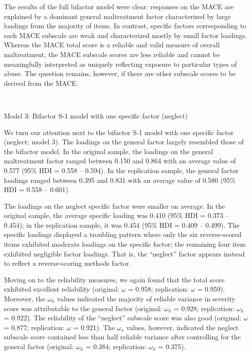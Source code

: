 \documentclass[letterpaper,man,natbib,noextraspace,floatsintext,longtable]{apa6}
\makeatletter
\renewcommand{\subsubsection}{\@startsection{subsubsection}{3}
  {\z@}%
  {\b@level@two@skip}{\e@level@two@skip}%
  {\normalfont\normalsize\bfseries}}
\makeatother
\begin{document}
The results of the full bifactor model were clear: responses on the MACE are explained by a dominant general maltreatment factor characterized by large loadings from the majority of items. In contrast, specific factors corresponding to each MACE subscale are weak and characterized mostly by small factor loadings. Whereas the MACE total score is a reliable and valid measure of overall maltreatment, the MACE subscale scores are less reliable and cannot be meaningfully interpreted as uniquely reflecting exposure to particular types of abuse. The question remains, however, if there are other subscale scores to be derived from the MACE. 

{\begin{spacing}{0.2} \hfill \\ \end{spacing}} \subsubsection{Model 3: Bifactor S-1 model with one specific factor (neglect)}

We turn our attention next to the bifactor S-1 model with one specific factor (neglect; model 3). The loadings on the general factor largely resembled those of the bifactor model. In the original sample, the loadings on the general maltreatment factor ranged between 0.150 and 0.864 with an average value of 0.577 (95\% HDI = 0.558 -- 0.594). In the replication sample, the general factor loadings ranged between 0.395 and 0.831 with an average value of 0.580 (95\% HDI = 0.558 -- 0.601). 

The loadings on the neglect specific factor were smaller on average. In the original sample, the average specific loading was 0.410 (95\% HDI = 0.373 -- 0.454); in the replication sample, it was 0.454 (95\% HDI = 0.409 -- 0.499). The specific loadings displayed a troubling pattern where only the six reverse-scored items exhibited moderate loadings on the specific factor; the remaining four item exhibited negligible factor loadings. That is, the ``neglect'' factor appears instead to reflect a reverse-scoring methods factor.

Moving on to the reliability measures, we again found that the total score exhibited excellent reliability (original: $\omega$ = 0.958; replication: $\omega$ = 0.959). Moreover, the $\omega_h$ values indicated the majority of reliable variance in severity score was attributable to the general factor (original: $\omega_h$ = 0.928; replication: $\omega_h$ = 0.922). The reliability of the ``neglect'' subscale score was also good (original: $\omega$ = 0.877; replication: $\omega$ = 0.921). The $\omega_s$ values, however, indicated the neglect subscale score contained less than half reliable variance after controlling for the general factor (original: $\omega_h$ = 0.384; replication: $\omega_h$ = 0.375). 
\end{document}
